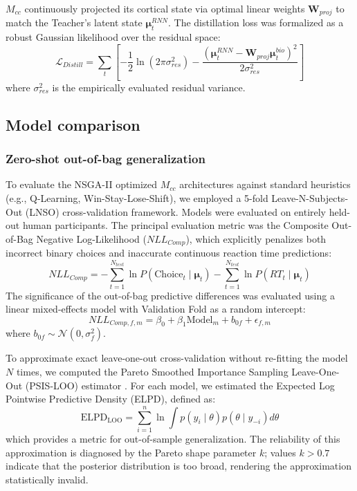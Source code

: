 \documentclass[12pt, a4paper]{extarticle}
\begin{document}
$M_{cc}$ continuously projected its cortical state via optimal linear weights $\mathbf{W}_{proj}$ to match the Teacher's latent state $\boldsymbol{\mu}_t^{RNN}$. The distillation loss was formalized as a robust Gaussian likelihood over the residual space:
\begin{equation}
	\mathcal{L}_{Distill} = \sum_{t} \left[ -\frac{1}{2}\ln(2\pi\sigma_{res}^2) - \frac{(\boldsymbol{\mu}_t^{RNN} - \mathbf{W}_{proj}\boldsymbol{\mu}_t^{bio})^2}{2\sigma_{res}^2} \right]
\end{equation}
where $\sigma_{res}^2$ is the empirically evaluated residual variance.

\subsection{Model comparison}

\subsubsection{Zero-shot out-of-bag generalization}
To evaluate the NSGA-II optimized $M_{cc}$ architectures against standard heuristics (e.g., Q-Learning, Win-Stay-Lose-Shift), we employed a 5-fold Leave-N-Subjects-Out (LNSO) cross-validation framework. Models were evaluated on entirely held-out human participants. The principal evaluation metric was the Composite Out-of-Bag Negative Log-Likelihood ($NLL_{Comp}$), which explicitly penalizes both incorrect binary choices and inaccurate continuous reaction time predictions:
\begin{equation}
	NLL_{Comp} = -\sum_{t=1}^{N_{test}} \ln P(\text{Choice}_t \mid \boldsymbol{\mu}_t) - \sum_{t=1}^{N_{test}} \ln P(RT_t \mid \boldsymbol{\mu}_t)
\end{equation}
The significance of the out-of-bag predictive differences was evaluated using a linear mixed-effects model with Validation Fold as a random intercept:
\begin{equation}
	NLL_{Comp, f, m} = \beta_0 + \beta_1 \mathrm{Model}_{m} + b_{0f} + \epsilon_{f,m}
\end{equation}
where $b_{0f} \sim \mathcal{N}(0, \sigma_f^2)$.

To approximate exact leave-one-out cross-validation without re-fitting the model $N$ times, we computed the Pareto Smoothed Importance Sampling Leave-One-Out (PSIS-LOO) estimator \parencite{vehtari2017practical}. For each model, we estimated the Expected Log Pointwise Predictive Density (ELPD), defined as:
\begin{equation}
\text{ELPD}_{\text{LOO}} = \sum_{i=1}^n \ln \int p(y_i \mid \theta) p(\theta \mid y_{-i}) d\theta
\end{equation}
which provides a metric for out-of-sample generalization. The reliability of this approximation is diagnosed by the Pareto shape parameter $k$; values $k > 0.7$ indicate that the posterior distribution is too broad, rendering the approximation statistically invalid.
\end{document}
